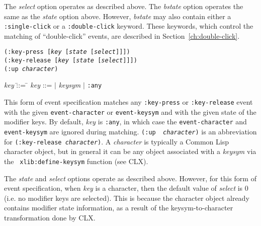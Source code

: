 \documentclass[twoside]{book}
\begin{document}
\begin{sloppy}
\begin{flushright}
\parbox[t]{5.75in}{
The {\em select} option operates as described above. The {\em bstate}
option operates the same as the {\em state} option above. However, {\em
bstate} may also contain either a {\tt :single-click} or a {\tt :double-click}
keyword. These keywords, which control the matching of ``double-click''
events, are described in Section~\ref{ch:double-click}.
}
\end{flushright}

\pagebreak
{\samepage
{}
{\tt (:key-press [{\em key} [{\em state} [{\em select}]]])}\\
{\tt (:key-release [{\em key} [{\em state} [{\em select}]]])}\\
{\tt (:up {\em character})}\\
\hspace*{.75in}
\parbox[t]{5.75in}{
\begin{tabbing}
{\em key} \= ::= \= \kill
{\em key}       \>::=  $|$ {\em keysym} $|$ {\tt :any} \\
\end{tabbing}}}
\begin{flushright}
\parbox[t]{5.75in}{
This
form of event specification matches any {\tt :key-press} or {\tt :key-release}
event with the given {\tt event-character} or {\tt event-keysym} and with the
given state of the modifier keys. By default, {\em key} is {\tt :any}, in which
case the {\tt event-character} and {\tt event-keysym} are ignored during
matching.
{\tt (:up {\em
character})} is an abbreviation for {\tt (:key-release {\em character})}.
A {\em character} is typically a Common Lisp character object, but in general
it can be any object associated with a {\em keysym} via the {\tt
xlib:define-keysym} function (see CLX\cite{clx}).}

\parbox[t]{5.75in}{
The {\em state} and {\em select}
options operate as described above. However, for this form of event
specification, when {\em key} is a character, then the default value of
{\em select} is 0 (i.e. no modifier keys are selected). This is because
the character object already contains modifier state information, as a
result of the keysym-to-character transformation done by CLX.
}
\end{flushright} 


\end{sloppy}
\end{document}
